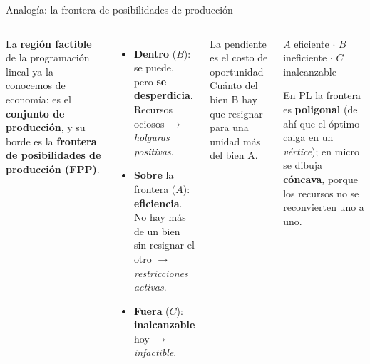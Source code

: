 \documentclass[aspectratio=169,10pt]{beamer}
\begin{document}
\begin{frame}{Analogía: la frontera de posibilidades de producción}

\begin{columns}[T]
\small
La \textbf{región factible} de la programación lineal ya la conocemos de economía: es el
\textbf{conjunto de producción}, y su borde es la \textbf{frontera de posibilidades de
producción (FPP)}.

\vspace{0.15cm}

\begin{itemize}
    \item \textbf{Dentro} ($B$): se puede, pero \textbf{se desperdicia}. Recursos ociosos
    $\rightarrow$ \textit{holguras positivas}.
    \item \textbf{Sobre} la frontera ($A$): \textbf{eficiencia}. No hay más de un bien sin
    resignar el otro $\rightarrow$ \textit{restricciones activas}.
    \item \textbf{Fuera} ($C$): \textbf{inalcanzable} hoy $\rightarrow$ \textit{infactible}.
\end{itemize}

\vspace{0.1cm}

\begin{alertblock}{La pendiente es el costo de oportunidad}
Cuánto del bien B hay que resignar para una unidad más del bien A.
\end{alertblock}

\begin{center}

{\scriptsize $A$ eficiente $\cdot$ $B$ ineficiente $\cdot$ $C$ inalcanzable}

\vspace{0.2cm}
{\scriptsize En PL la frontera es \textbf{poligonal} (de ahí que el óptimo caiga en un
\textit{vértice}); en micro se dibuja \textbf{cóncava}, porque los recursos no se reconvierten
uno a uno.}
\end{center}
\end{columns}

\end{frame}
\end{document}
